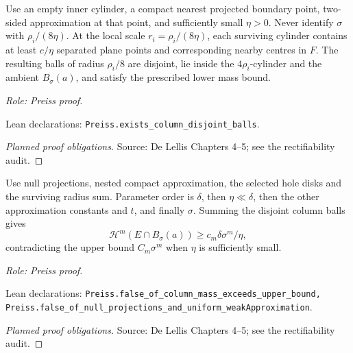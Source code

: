 \begin{lemma}
\label{lem:column-packing}







Use an empty inner cylinder, a compact nearest projected boundary point, two-sided approximation at that point, and sufficiently small \(\eta>0\). Never identify \(\sigma\) with \(\rho_i/(8\eta)\).
At the local scale \(r_i=\rho_i/(8\eta)\), each surviving cylinder contains at least \(c/\eta\) separated plane points and corresponding nearby centres in \(F\). The resulting balls of radius \(\rho_i/8\) are disjoint, lie inside the \(4\rho_i\)-cylinder and the ambient \(B_\sigma(a)\), and satisfy the prescribed lower mass bound.
\par\emph{Role: Preiss proof.}
\par Lean declarations: \texttt{Preiss.exists\_column\_disjoint\_balls}.
\end{lemma}
\begin{proof}[Planned proof obligations]

\par Source: De Lellis Chapters 4--5; see the rectifiability audit.
\end{proof}

\begin{lemma}
\label{lem:packing-contradiction}







Use null projections, nested compact approximation, the selected hole disks and the surviving radius sum. Parameter order is \(\delta\), then \(\eta\ll\delta\), then the other approximation constants and \(t\), and finally \(\sigma\).
Summing the disjoint column balls gives
\[
 \mathcal H^m(E\cap B_\sigma(a))
 \geq c_m\delta\sigma^m/\eta,
\]
contradicting the upper bound \(C_m\sigma^m\) when \(\eta\) is sufficiently small.
\par\emph{Role: Preiss proof.}
\par Lean declarations: \texttt{Preiss.false\_of\_column\_mass\_exceeds\_upper\_bound, Preiss.false\_of\_null\_projections\_and\_uniform\_weakApproximation}.
\end{lemma}
\begin{proof}[Planned proof obligations]

\par Source: De Lellis Chapters 4--5; see the rectifiability audit.
\end{proof}

